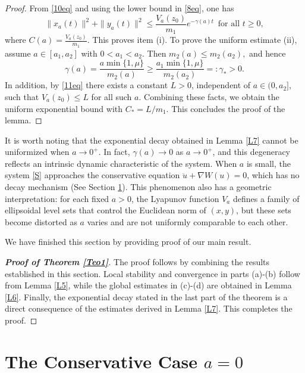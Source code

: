 \documentclass[12pt]{amsart}
\numberwithin{equation}{section}
\begin{document}
\begin{proof}
From \eqref{10eq} and using the lower bound in \eqref{8eq}, one has
$$
\|x_a(t)\|^2+\|y_a(t)\|^2 \le \frac{V_a(z_0)}{m_1}e^{-\gamma(a) t}\, \text{ for all }t\ge 0,
$$ 
where $C(a)=\frac{V_a(z_0)}{m_1}$. This proves item (i). To prove the uniform estimate (ii), assume $a\in[a_1,a_2]$ with 
$0<a_1<a_2$. Then $m_2(a)\le m_2(a_2),$ and hence
$$
\gamma(a)= \frac{a\min\{1,\mu\}}{m_2(a)}\ge \frac{a_1\min\{1,\mu\}}{m_2(a_2)}=: \gamma_* > 0.
$$In addition, by \eqref{11eq} there exists a constant $L>0$, independent of $a\in(0,a_2]$, such that $V_a(z_0)\le L$ for all such $a$. Combining these facts, we obtain the uniform exponential bound with $C_* = L/m_1$. This concludes the proof of the lemma.
\end{proof}

It is worth noting that the exponential decay obtained in Lemma \ref{L7} cannot be uniformized when $a\to 0^{+}$. In fact, $\gamma(a)\to 0$ as $a\to 0^{+}$, and this degeneracy reflects an intrinsic dynamic characteristic of the system. When $a$ is small, the system \eqref{S} approaches the conservative equation $\ddot{u}+\nabla W(u)=0$, which has no decay mechanism (See Section \ref{Sec3}). This phenomenon also has a geometric interpretation: for each fixed $a>0$, the Lyapunov function $V_a$ defines a family of ellipsoidal level sets that control the Euclidean norm of $(x,y)$, but these sets become distorted as $a$ varies and are not uniformly comparable to each other.

We have finished this section by providing proof of our main result.

\begin{proof}[{\bf Proof of Theorem \ref{Teo1}}]
The proof follows by combining the results established in this section. Local stability and convergence in parts (a)-(b) follow from Lemma \ref{L5}, while the global estimates in (c)-(d) are obtained in Lemma \ref{L6}. Finally, the exponential decay stated in the last part of the theorem is a direct consequence of the estimates derived in Lemma \ref{L7}. This completes the proof.
\end{proof}

\section{The Conservative Case $a=0$}\label{Sec3}
\end{document}

